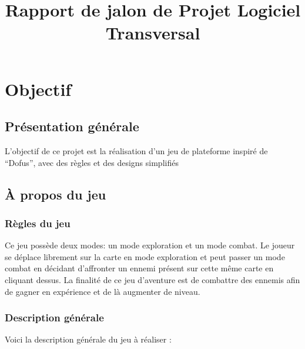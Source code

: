\documentclass[11pt, a4paper]{article}
\begin{document}
\title{Rapport de jalon de Projet Logiciel Transversal}

\maketitle

\tableofcontents
\newpage
 
\section{Objectif}

\subsection{Présentation générale}

L’objectif de ce projet est la réalisation d’un jeu de plateforme inspiré de “Dofus”, avec des règles et des designs simplifiés

\subsection{À propos du jeu}

\subsubsection{Règles du jeu}

Ce jeu possède deux modes: un mode exploration et un mode combat. Le joueur se déplace librement sur la carte en mode exploration et peut passer un mode combat en décidant d’affronter un ennemi présent sur cette même carte en cliquant dessus. La finalité de ce jeu d’aventure est de combattre des ennemis afin de gagner en expérience et de là augmenter de niveau.

\subsubsection{Description générale}

Voici la description générale du jeu à réaliser :
\end{document}
